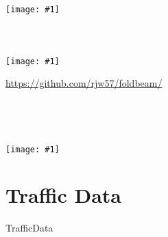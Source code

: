 \documentclass[aspectratio=169]{beamer}
\newcommand{\wideimage}[1]{%
  \begin{frame}
    \centering
    \texttt{[image: \#1]}
    \\
  \end{frame}
}
\begin{document}
\wideimage{img/wgs84-links.pdf}

\begin{frame}
  \inputminted[lastline=7]{python}{bng-links.py}
\end{frame}

\begin{frame}
  \inputminted[firstline=9, lastline=19]{python}{bng-links.py}
\end{frame}

\begin{frame}
  \inputminted[firstline=21, lastline=31]{python}{bng-links.py}
\end{frame}

\wideimage{img/bng-links.pdf}

\begin{frame}
  \centering
  \parbox{0.6\textwidth}{%
    \url{https://github.com/rjw57/foldbeam/}
    \\
    \vspace{2\baselineskip}
    \inputminted{console}{foldbeam-render.sh}
  }
  \\
\end{frame}

\begin{frame}
  \inputminted[firstline=33, lastline=40]{python}{bng-links.py}
\end{frame}

\wideimage{img/bng-links-2.pdf}

\section{Traffic Data}

\begin{frame}
  \centering\Huge
  TrafficData
  \\
\end{frame}

\begin{frame}
  \inputminted{xml}{TrafficData/content.xml}
\end{frame}

\begin{frame}
  \inputminted{python}{TrafficData/parse.py}
\end{frame}

\begin{frame}
  \inputminted{python}{TrafficData/link_data.py}
\end{frame}

\begin{frame}
  \inputminted{python}{TrafficData/hist.py}
\end{frame}
\end{document}
